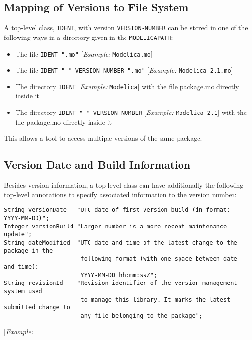 \subsection{Mapping of Versions to File System}

A top-level class, \lstinline!IDENT!, with version \lstinline!VERSION-NUMBER! can be stored in
one of the following ways in a directory given in the \lstinline!MODELICAPATH!:

\begin{itemize}
\item
  The file \lstinline!IDENT ".mo"! {[}\emph{Example:} \lstinline!Modelica.mo!{]}
\item
  The file \lstinline!IDENT " " VERSION-NUMBER ".mo"! {[}\emph{Example:} \lstinline!Modelica 2.1.mo!{]}
\item
  The directory \lstinline!IDENT! {[}\emph{Example:} \lstinline!Modelica!{]} with the file
  package.mo directly inside it
\item
  The directory \lstinline!IDENT " " VERSION-NUMBER! {[}\emph{Example:}
	\lstinline!Modelica 2.1!{]} with the file package.mo directly inside it
\end{itemize}

This allows a tool to access multiple versions of the same package.

\subsection{Version Date and Build Information}

Besides version information, a top level class can have additionally the
following top-level annotations to specify associated information to the
version number:

\begin{lstlisting}[language=modelica]
String versionDate   "UTC date of first version build (in format: YYYY-MM-DD)";
Integer versionBuild "Larger number is a more recent maintenance update";
String dateModified  "UTC date and time of the latest change to the package in the
                      following format (with one space between date and time):
                      YYYY-MM-DD hh:mm:ssZ";
String revisionId    "Revision identifier of the version management system used
                      to manage this library. It marks the latest submitted change to
                      any file belonging to the package";
\end{lstlisting}
{[}\emph{Example:}

